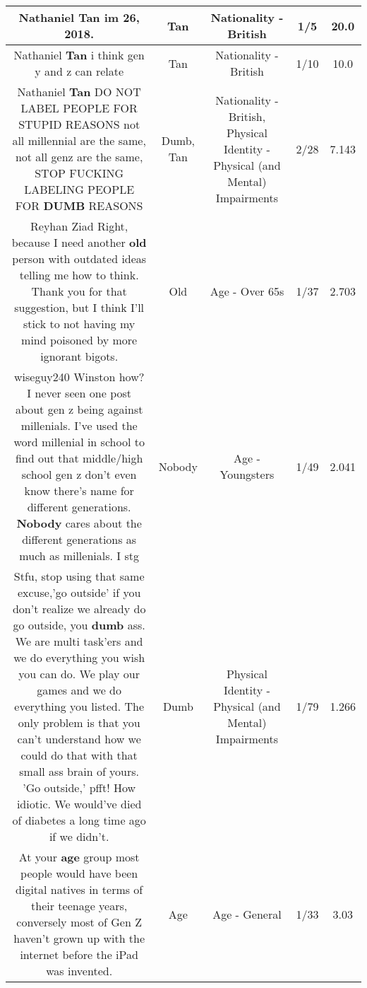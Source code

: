 \documentclass[11pt]{article}
\newlength\mylength
\begin{document}
\begin{center}
\begin{longtable}{|C{.65\mylength}|C{.30\mylength}|C{.12\mylength}|C{.12\mylength}|C{.12\mylength}|}
  \small Nathaniel \textbf{Tan} im 26, 2018.\normalsize   & Tan & Nationality - British & 1/5 & 20.0 \\  \hline
  \small Nathaniel \textbf{Tan} i think gen y and z can relate\normalsize   & Tan & Nationality - British & 1/10 & 10.0 \\  \hline
  \small Nathaniel \textbf{Tan} DO NOT LABEL PEOPLE FOR STUPID REASONS not all millennial are the same, not all genz are the same, STOP FUCKING LABELING PEOPLE FOR \textbf{DUMB} REASONS\normalsize   & Dumb, Tan & Nationality - British, Physical Identity - Physical (and Mental) Impairments & 2/28 & 7.143 \\  \hline
  \small Reyhan Ziad Right, because I need another \textbf{old} person with outdated ideas telling me how to think. Thank you for that suggestion, but I think I'll stick to not having my mind poisoned by more ignorant bigots.\normalsize   & Old & Age - Over 65s & 1/37 & 2.703 \\  \hline
  \small wiseguy240 Winston how? I never seen one post about gen z being against millenials. I've used the word millenial in school to find out that middle/high school gen z don't even know there's name for different generations. \textbf{Nobody} cares about the different generations as much as millenials. I stg\normalsize   & Nobody & Age - Youngsters & 1/49 & 2.041 \\  \hline
  \small Stfu, stop using that same excuse,'go outside' if you don't realize we already do go outside, you \textbf{dumb} ass. We are multi task'ers and we do everything you wish you can do. We play our games and we do everything you listed. The only problem is that you can't understand how we could do that with that small ass brain of yours. 'Go outside,' pfft! How idiotic. We would've died of diabetes a long time ago if we didn't.\normalsize   & Dumb & Physical Identity - Physical (and Mental) Impairments & 1/79 & 1.266 \\  \hline
  \small At your \textbf{age} group most people would have been digital natives in terms of their teenage years, conversely most of Gen Z haven't grown up with the internet before the iPad was invented.\normalsize   & Age & Age - General & 1/33 & 3.03 \\  \hline

\end{longtable}
\end{center}
\end{document}
